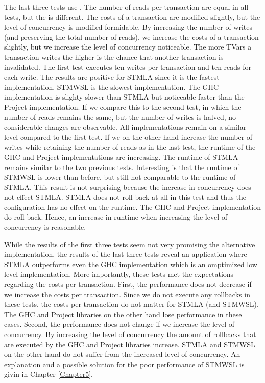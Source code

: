 The last three tests use . The number of reads per transaction are equal in all tests, but the 
 is different. The costs of a transaction are modified slightly, but the level of concurrency
is modified formidable. By increasing the number of writes (and preserving the total number of reads), we increase the costs of a transaction slightly, but we 
increase the level of concurrency noticeable. The more TVars a transaction writes the higher is the chance that another transaction is invalidated.
The first test executes ten writes
per transaction and ten reads for each write. The results are positive for STMLA since it is the fastest implementation.
STMWSL is the slowest implementation. The GHC implementation is slighty slower than STMLA but noticeable faster than the 
Project implementation. If we compare this to the second test, in which the number of reads remains the same, but the number of
writes is halved, no considerable changes are observable. All implementations remain on a similar level compared to the first
test. If we on the other hand increase the number of writes while retaining the number of reads as in the last test, the runtime of the
GHC and Project implementations are increasing. The runtime of STMLA remains similar to the two previous tests. 
Interesting is that the runtime of STMWSL is lower than before, but still not comparable to the runtime of STMLA.
This result is not surprising because the increase in concurrency does not effect STMLA. STMLA does not roll back at
all in this test and thus the configuration has no effect on the runtime. The GHC and Project implementation do
roll back. Hence, an increase in runtime when increasing the level of concurrency is reasonable.

While the results of the first three tests seem not very promising the alternative implementation, the results
of the last three tests reveal an application where STMLA outperforms even the GHC implementation which is 
an omptimized low level  implementation. 
More importantly, these tests met the expectations regarding the costs per transaction. First,
the performance does not decrease if we increase the costs per transaction. Since we do not execute any rollbacks in these 
tests, the costs per transaction do not matter for STMLA (and STMWSL). The GHC and Project libraries on the other hand 
lose performance in these cases. Second, the performance does not change if we increase the level of concurrency. By increasing
the level of concurrency the amount of rollbacks that are executed by the GHC and Project libraries increase. STMLA and STMWSL
on the other hand do not suffer from the increased level of concurrency. 
An explanation and a possible solution for the poor performance of STMWSL is givin in Chapter \ref{Chapter5}.


